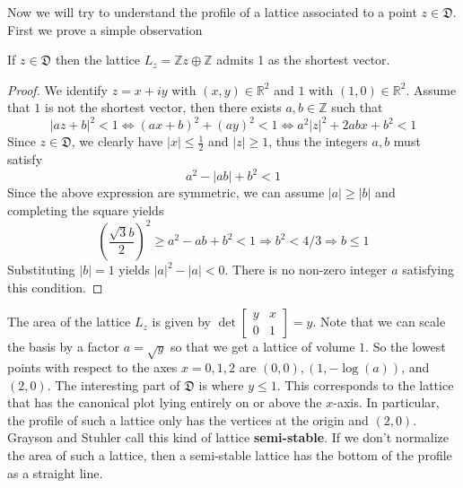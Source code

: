Now we will try to understand the profile of a lattice associated to a point $z \in \mathfrak{D}$. First we
prove a simple observation
\begin{lemma}
  If $z \in \mathfrak{D}$ then the lattice $L_z = \mathbb{Z}z\oplus \mathbb{Z}$ admits 1 as the shortest vector.
\end{lemma}
\begin{proof}
  We identify $z = x+iy$ with $(x,y) \in \mathbb{R}^2$ and $1$ with $(1,0) \in \mathbb{R}^2$.
  Assume that $1$ is not the shortest vector, then there exists $a,b \in \mathbb{Z}$ such that
  \[ |az+b|^2 < 1 \Leftrightarrow (ax+b)^2+(ay)^2 < 1\Leftrightarrow a^2|z|^2+2abx+b^2< 1\]
  Since $z \in \mathfrak{D}$, we clearly have $|x| \le \frac{1}{2}$ and $|z| \ge 1$,  thus the integers $a,b$ must
  satisfy
  \[ a^2 -|ab|+b^2 < 1\]
  Since the above expression are symmetric, we can assume $|a| \ge |b|$ and completing the square yields
  \[\left(\dfrac{\sqrt{3}b}{2}\right)^2 \ge a^2-ab+b^2 <1 \Rightarrow b^2<4/3 \Rightarrow b \le 1\]
  Substituting $|b|=1$ yields $|a|^2-|a|<0$. There is no non-zero integer $a$ satisfying this condition.
\end{proof}
The area of the lattice $L_z$ is given by $\det\begin{bmatrix}
    y & x \\
    0 & 1
  \end{bmatrix} = y$. Note that we can scale the basis by a factor $a=\sqrt{y}$ so that we get a lattice of volume $1$.
So the lowest points with respect to the axes $x = 0,1,2$ are $(0,0), (1,-\log(a))$, and $(2,0)$.
The interesting part of $\mathfrak{D}$ is where $y\le 1$. This corresponds to the lattice
that has the canonical plot lying entirely on or above the $x$-axis. In particular, the profile of such a lattice
only has the vertices at the origin and $(2,0)$. Grayson and Stuhler call this kind of lattice
\textbf{semi-stable}. If we don't normalize the area of such a lattice, then a semi-stable
lattice has the bottom of the profile as a straight line.
\vspace{\baselineskip}

